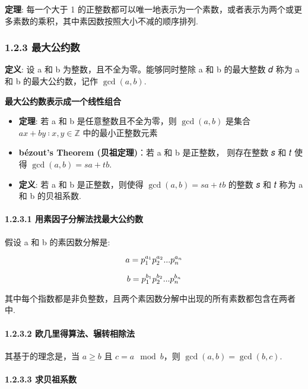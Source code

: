 \textbf{定理}: 每一个大于 1
的正整数都可以唯一地表示为一个素数，或者表示为两个或更多素数的乘积，其中素因数按照大小不减的顺序排列.

\subsubsection{1.2.3 最大公约数}\label{ux6700ux5927ux516cux7ea6ux6570}

\textbf{定义}: 设 a 和 b 为整数，且不全为零。能够同时整除 a 和 b
的最大整数 𝑑 称为 a 和 b 的最大公约数，记作 \(\gcd(a, b)\).

\textbf{最大公约数表示成一个线性组合}

\begin{itemize}
\tightlist
\item
  \textbf{定理}: 若 a 和 b 是任意整数且不全为零，则 \(\gcd(a, b)\)
  是集合 \({ax + by ∶ x, y \in \mathbb{Z}}\) 中的最小正整数元素
\item
  \textbf{bézout's Theorem (贝祖定理)}：若 a 和 b 是正整数， 则存在整数
  𝑠 和 𝑡 使得 \(\gcd(a, b) = sa + tb\).
\item
  \textbf{定义}: 若 a 和 b 是正整数，则使得 \(\gcd(a, b) = sa + tb\)
  的整数 𝑠 和 𝑡 称为 a 和 b 的贝祖系数.
\end{itemize}

\paragraph{1.2.3.1
用素因子分解法找最大公约数}\label{ux7528ux7d20ux56e0ux5b50ux5206ux89e3ux6cd5ux627eux6700ux5927ux516cux7ea6ux6570}

假设 a 和 b 的素因数分解是:

\[
\huge
a=p_1^{a_1}p_2^{a_2}...p_n^{a_n}
\]

\[
\huge
b=p_1^{b_1}p_2^{b_2}...p_n^{b_n}
\]

其中每个指数都是非负整数，且两个素因数分解中出现的所有素数都包含在两者中.

\paragraph{1.2.3.2
欧几里得算法、辗转相除法}\label{ux6b27ux51e0ux91ccux5f97ux7b97ux6cd5ux8f97ux8f6cux76f8ux9664ux6cd5}

其基于的理念是，当 \(a \geq b\) 且 \(c = a \mod b\)，则
\(\gcd(a, b) = \gcd(b, c)\).

\paragraph{1.2.3.3 求贝祖系数}\label{ux6c42ux8d1dux7956ux7cfbux6570}

